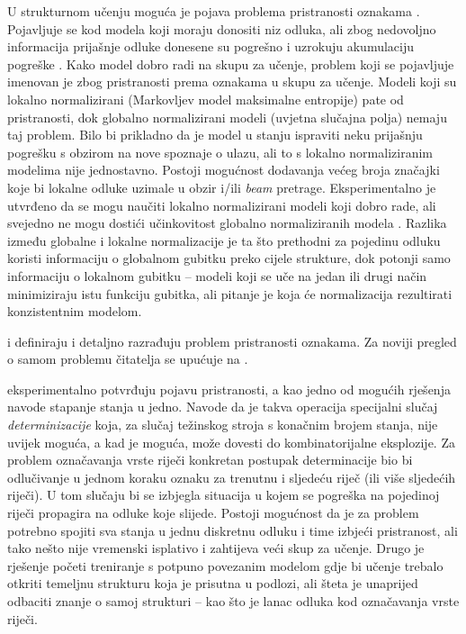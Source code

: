 U strukturnom učenju moguća je pojava problema pristranosti oznakama . Pojavljuje se kod modela koji moraju donositi niz odluka, ali zbog
nedovoljno informacija prijašnje odluke donesene su pogrešno i uzrokuju akumulaciju
pogreške . Kako model dobro radi na skupu za učenje,
problem koji se pojavljuje imenovan je zbog pristranosti prema oznakama u skupu
za učenje. Modeli koji su lokalno normalizirani (Markovljev model maksimalne
entropije) pate od pristranosti, dok globalno normalizirani modeli (uvjetna
slučajna polja) nemaju taj problem. Bilo bi prikladno da je model u stanju
ispraviti neku prijašnju pogrešku s obzirom na nove spoznaje o ulazu, ali to s
lokalno normaliziranim modelima nije jednostavno. Postoji mogućnost dodavanja
većeg broja značajki koje bi lokalne odluke uzimale u obzir i/ili \textit{beam}
pretrage. Eksperimentalno je utvrđeno da se mogu naučiti lokalno normalizirani
modeli koji dobro rade, ali svejedno ne mogu dostići učinkovitost globalno
normaliziranih modela \citep{liang2008structure}. Razlika između globalne i
lokalne normalizacije je ta što prethodni za pojedinu odluku koristi informaciju
o globalnom gubitku preko cijele strukture, dok potonji samo informaciju o
lokalnom gubitku -- modeli koji se uče na jedan ili drugi način minimiziraju
istu funkciju gubitka, ali pitanje je koja će normalizacija rezultirati
konzistentnim modelom.

\citet*{lafferty2001conditional} i \citet*{leon1991approche} definiraju i
detaljno razrađuju problem pristranosti oznakama. Za noviji pregled o samom
problemu čitatelja se upućuje na \citep{andor2016globally}.

\citet*{lafferty2001conditional} eksperimentalno potvrđuju pojavu pristranosti,
a kao jedno od mogućih rješenja navode stapanje stanja u jedno. Navode da je
takva operacija specijalni slučaj \emph{determinizacije} koja, za slučaj
težinskog stroja s konačnim brojem stanja, nije uvijek moguća, a kad je moguća,
može dovesti do kombinatorijalne eksplozije. Za problem označavanja vrste riječi
konkretan postupak determinacije bio bi odlučivanje u jednom koraku oznaku za
trenutnu i sljedeću riječ (ili više sljedećih riječi). U tom slučaju bi se
izbjegla situacija u kojem se pogreška na pojedinoj riječi propagira na odluke
koje slijede. Postoji mogućnost da je za problem potrebno spojiti sva stanja u
jednu diskretnu odluku i time izbjeći pristranost, ali tako nešto nije
vremenski isplativo i zahtijeva veći skup za učenje. Drugo je rješenje početi
treniranje s potpuno povezanim modelom gdje bi učenje trebalo otkriti temeljnu
strukturu koja je prisutna u podlozi, ali šteta je unaprijed odbaciti znanje o
samoj strukturi -- kao što je lanac odluka kod označavanja vrste riječi.

